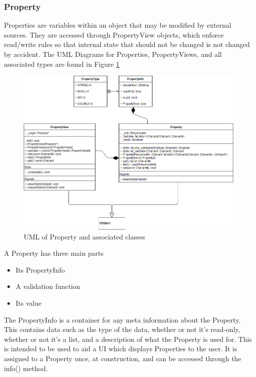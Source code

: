  \subsubsection*{Property}
 	Properties are variables within an object that may be modified by external sources. They are accessed through PropertyView objects, which enforce read/write rules so that internal state that should not be changed is not changed by accident. The UML Diagrams for Properties, PropertyViews, and all associated types are found in Figure \ref{uml:property}
 	
 \begin{figure}[h!]
 	\begin{center}
 	\includegraphics[width=\textwidth]{./images_design/uml/Property}
 	\caption{UML of Property and associated classes\label{uml:property}}
 	\end{center}
 \end{figure} 
 
 	A Property has three main parts
 	\begin{itemize}
 		\item Its PropertyInfo
 		\item A validation function
 		\item Its value
 	\end{itemize}
 	
 	The PropertyInfo is a container for any meta information about the Property. This contains data such as the type of the data, whether or not it's read-only, whether or not it's a list, and a description of what the Property is used for. This is intended to be used to aid a UI which displays Properties to the user. It is assigned to a Property once, at construction, and can be accessed through the info() method.
 	
